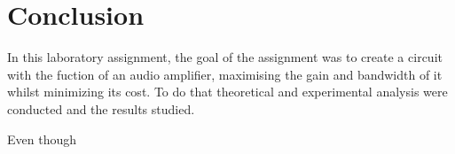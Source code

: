 \section{Conclusion}
\label{sec:conclusion}

\par In this laboratory assignment, the goal of the assignment was to create a circuit with the fuction of an audio amplifier, maximising the gain and bandwidth of it whilst minimizing its cost. To do that theoretical and experimental analysis were conducted and the results studied.
\par Even though 



